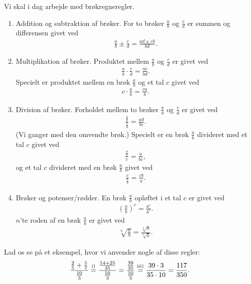 \documentclass[12pt]{article}
\begin{document}
Vi skal i dag arbejde med brøkregneregler.
\begin{enumerate}[label=\roman*)]
\item Addition og subtraktion af brøker. For to brøker $\frac{a}{b}$ og $\frac{c}{d}$ er summen og differensen givet ved
\begin{align*}
\frac{a}{b} \pm \frac{c}{d} = \frac{ad\pm cb}{bd}.
\end{align*}
\item Multiplikation af brøker. Produktet mellem $\frac{a}{b}$ og $\frac{c}{d}$ er givet ved
\begin{align*}
\frac{a}{b}\cdot \frac{c}{d} = \frac{ac}{bd}.
\end{align*}
Specielt er produktet mellem en brøk $\frac{a}{b}$ og et tal $c$ givet ved
\begin{align*}
c\cdot \frac{a}{b} = \frac{ca}{b}.
\end{align*}
\item Division af brøker. Forholdet mellem to brøker $\frac{a}{b}$ og $\frac{c}{d}$ er givet ved
\begin{align*}
\frac{\frac{a}{b}}{\frac{c}{d}} = \frac{ad}{bc}.
\end{align*}
(Vi ganger med den omvendte brøk.) Specielt er en brøk $\frac{a}{b}$ divideret med et tal $c$ givet ved
\begin{align*}
\frac{\frac{a}{b}}{c} = \frac{a}{bc},
\end{align*}
og et tal $c$ divideret med en brøk $\frac{a}{b}$ givet ved
\begin{align*}
\frac{c}{\frac{a}{b}} = \frac{cb}{a}.
\end{align*}
\item Brøker og potenser/rødder. En brøk $\frac{a}{b}$ opløftet i et tal $c$ er givet ved 
\begin{align*}
\left(\frac{a}{b}\right)^{c} = \frac{a^c}{b^c}.
\end{align*}
$n$'te roden af en brøk $\frac{a}{b}$ er givet ved 
\begin{align*}
\sqrt[n]{\frac{a}{b}} = \frac{\sqrt[n]{a}}{\sqrt[n]{b}}.
\end{align*}
\end{enumerate}
\begin{exa}
Lad os se på et eksempel, hvor vi anvender nogle af disse regler:
\begin{align*}
\frac{\frac{2}{5}+\frac{5}{7}}{\frac{10}{3}} \overset{\textnormal{i)}}{=} \frac{\frac{14+25}{35}}{\frac{10}{3}} = \frac{\frac{39}{35}}{\frac{10}{3}} \overset{\textnormal{iii)}}{=} \frac{39\cdot 3}{35 \cdot 10} = \frac{117}{350}.
\end{align*}
\end{exa}
\end{document}
